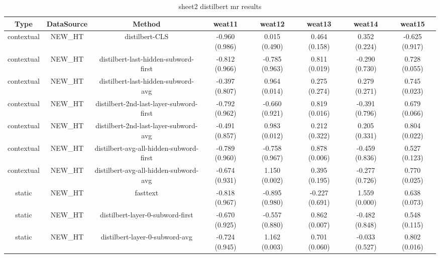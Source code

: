 \begin{sidewaystable}[htb]
    \centering
    \caption{sheet2 distilbert mr results}
    \label{appendix_tab:sheet2_distilbert_mr_results}
    \small
    \begin{tabular}{@{}cccccccc@{}}
        \toprule
        Type & DataSource & Method & weat11 & weat12 & weat13 & weat14 & weat15 \\
        \midrule
        contextual & NEW\_HT & distilbert-CLS & -0.960 (0.986) & 0.015 (0.490) & 0.464 (0.158) & 0.352 (0.224) & -0.625 (0.917) \\
        contextual & NEW\_HT & distilbert-last-hidden-subword-first & -0.812 (0.966) & -0.785 (0.963) & 0.811 (0.019) & -0.290 (0.730) & 0.728 (0.055) \\
        contextual & NEW\_HT & distilbert-last-hidden-subword-avg & -0.397 (0.807) & 0.964 (0.014) & 0.275 (0.274) & 0.279 (0.271) & 0.745 (0.023) \\
        contextual & NEW\_HT & distilbert-2nd-last-layer-subword-first & -0.792 (0.962) & -0.660 (0.921) & 0.819 (0.016) & -0.391 (0.796) & 0.679 (0.066) \\
        contextual & NEW\_HT & distilbert-2nd-last-layer-subword-avg & -0.491 (0.857) & 0.983 (0.012) & 0.212 (0.322) & 0.205 (0.331) & 0.804 (0.022) \\
        contextual & NEW\_HT & distilbert-avg-all-hidden-subword-first & -0.789 (0.960) & -0.758 (0.967) & 0.878 (0.006) & -0.459 (0.836) & 0.527 (0.123) \\
        contextual & NEW\_HT & distilbert-avg-all-hidden-subword-avg & -0.674 (0.931) & 1.150 (0.002) & 0.395 (0.195) & -0.277 (0.726) & 0.770 (0.025) \\
        static & NEW\_HT & fasttext & -0.818 (0.967) & -0.895 (0.980) & -0.227 (0.691) & 1.559 (0.000) & 0.638 (0.073) \\
        static & NEW\_HT & distilbert-layer-0-subword-first & -0.670 (0.925) & -0.557 (0.880) & 0.862 (0.007) & -0.482 (0.848) & 0.548 (0.115) \\
        static & NEW\_HT & distilbert-layer-0-subword-avg & -0.724 (0.945) & 1.162 (0.003) & 0.701 (0.060) & -0.033 (0.527) & 0.802 (0.016) \\
        \bottomrule
    \end{tabular}
\end{sidewaystable}